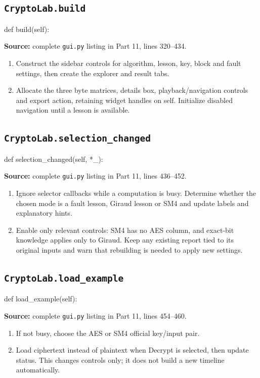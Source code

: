 \subsection{\texttt{CryptoLab.build}}
\begin{lightcode}
def build(self):
\end{lightcode}
\noindent\textbf{Source:} complete \texttt{gui.py} listing in Part 11, lines 320--434.
\begin{enumerate}
\item Construct the sidebar controls for algorithm, lesson, key, block and fault settings, then create the explorer and result tabs.
\item Allocate the three byte matrices, details box, playback/navigation controls and export action, retaining widget handles on self. Initialize disabled navigation until a lesson is available.
\end{enumerate}
\subsection{\texttt{CryptoLab.selection\_\allowbreak{}changed}}
\begin{lightcode}
def selection_changed(self, *_):
\end{lightcode}
\noindent\textbf{Source:} complete \texttt{gui.py} listing in Part 11, lines 436--452.
\begin{enumerate}
\item Ignore selector callbacks while a computation is busy. Determine whether the chosen mode is a fault lesson, Giraud lesson or SM4 and update labels and explanatory hints.
\item Enable only relevant controls: SM4 has no AES column, and exact-bit knowledge applies only to Giraud. Keep any existing report tied to its original inputs and warn that rebuilding is needed to apply new settings.
\end{enumerate}
\subsection{\texttt{CryptoLab.load\_\allowbreak{}example}}
\begin{lightcode}
def load_example(self):
\end{lightcode}
\noindent\textbf{Source:} complete \texttt{gui.py} listing in Part 11, lines 454--460.
\begin{enumerate}
\item If not busy, choose the AES or SM4 official key/input pair.
\item Load ciphertext instead of plaintext when Decrypt is selected, then update status. This changes controls only; it does not build a new timeline automatically.
\end{enumerate}
